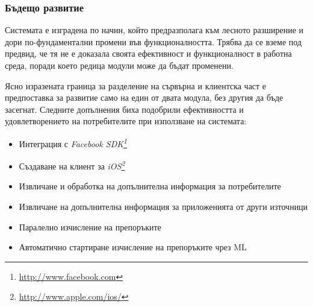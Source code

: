 \subsubsection{Бъдещо развитие}

	Системата е изградена по начин, който предразполага към лесното разширение и дори по-фундаментални промени във функционалността.
	Трябва да се вземе под предвид, че тя не е доказала своята ефективност и функционалност в работна среда, поради което редица модули може да бъдат променени.
	
	Ясно изразената граница за разделение на сървърна и клиентска част е предпоставка за развитие само на един от двата модула, без другия да бъде засегнат. Следните допълнения биха подобрили ефективността и удовлетворението на потребителите при използване на системата:
	
	\begin{itemize}
		\item Интеграция с \emph{Facebook SDK\footnote{\url{http://www.facebook.com}}}
		\item Създаване на клиент за \emph{iOS\footnote{\url{http://www.apple.com/ios/}}}
		\item Извличане и обработка на допълнителна информация за потребителите
		\item Извличане на допълнителна информация за приложенията от други източници
		\item Паралелно изчисление на препоръките
		\item Автоматично стартиране изчисление на препоръките чрез \ac{ML}
	\end{itemize}
